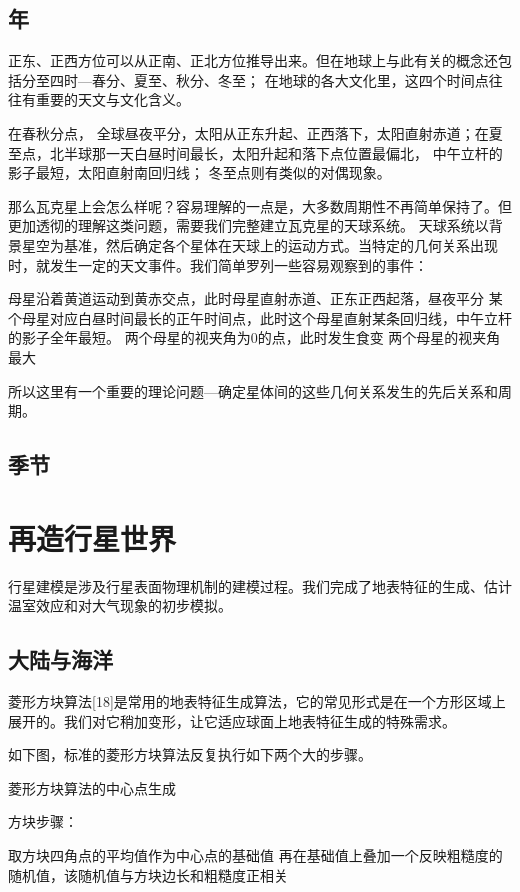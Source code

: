\documentclass[a4paper,10.5pt]{article}
\begin{document}
\subsection{年}

正东、正西方位可以从正南、正北方位推导出来。但在地球上与此有关的概念还包括分至四时—春分、夏至、秋分、冬至；
在地球的各大文化里，这四个时间点往往有重要的天文与文化含义。

在春秋分点， 全球昼夜平分，太阳从正东升起、正西落下，太阳直射赤道；在夏至点，北半球那一天白昼时间最长，太阳升起和落下点位置最偏北，
中午立杆的影子最短，太阳直射南回归线； 冬至点则有类似的对偶现象。

那么瓦克星上会怎么样呢？容易理解的一点是，大多数周期性不再简单保持了。但更加透彻的理解这类问题，需要我们完整建立瓦克星的天球系统。
天球系统以背景星空为基准，然后确定各个星体在天球上的运动方式。当特定的几何关系出现时，就发生一定的天文事件。我们简单罗列一些容易观察到的事件：

母星沿着黄道运动到黄赤交点，此时母星直射赤道、正东正西起落，昼夜平分
某个母星对应白昼时间最长的正午时间点，此时这个母星直射某条回归线，中午立杆的影子全年最短。
两个母星的视夹角为0的点，此时发生食变
两个母星的视夹角最大

所以这里有一个重要的理论问题—确定星体间的这些几何关系发生的先后关系和周期。

\subsection{季节}

\section{再造行星世界}

行星建模是涉及行星表面物理机制的建模过程。我们完成了地表特征的生成、估计温室效应和对大气现象的初步模拟。

\subsection{大陆与海洋}

菱形方块算法[18]是常用的地表特征生成算法，它的常见形式是在一个方形区域上展开的。我们对它稍加变形，让它适应球面上地表特征生成的特殊需求。

如下图，标准的菱形方块算法反复执行如下两个大的步骤。


菱形方块算法的中心点生成

方块步骤：

取方块四角点的平均值作为中心点的基础值
再在基础值上叠加一个反映粗糙度的随机值，该随机值与方块边长和粗糙度正相关
\end{document}
